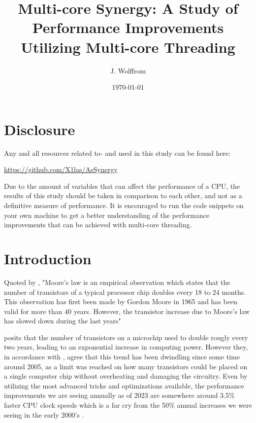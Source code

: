 \documentclass[12pt,a4paper]{article}
\title{Multi-core Synergy: A Study of Performance Improvements Utilizing Multi-core Threading}
\author{J. Wolffrom}
\date{\today}
\begin{document}
\maketitle
\newpage

\begin{abstract}

\end{abstract}
\newpage

\tableofcontents
\newpage

\section{Disclosure}

Any and all resources related to- and used in this study can be found here:

\href{https://github.com/X1las/AsSynergy}{https://github.com/X1las/AsSynergy}

Due to the amount of variables that can affect the performance of a CPU, the results of this study should be taken in comparison to each other, and not as a definitive measure of performance. It is encouraged to run the code snippets on your own machine to get a better understanding of the performance improvements that can be achieved with multi-core threading.

\section{Introduction}

Quoted by \cite{Rauber2023}, "Moore’s law is an empirical
observation which states that the number of transistors of a typical processor chip
doubles every 18 to 24 months. This observation has first been made by Gordon
Moore in 1965 and has been valid for more than 40 years. However, the transistor
increase due to Moore’s law has slowed down during the last years" 

\citeauthor{Rauber2023} posits that the number of transistors on a microchip used to double rougly every two years, leading to an exponential increase in computing power. However they, in accordance with \cite{Mattson2014}, agree that this trend has been dwindling since some time around 2005, as a limit was reached on how many transistors could be placed on a single computer chip without overheating and damaging the circuitry. Even by utilizing the most advanced tricks and optimizations available, the performance improvements we are seeing annually as of 2023 are somewhere around 3.5\% faster CPU clock speeds \parencite[p. 11]{Rauber2023} which is a far cry from the 50\% annual increases we were seeing in the early 2000's \parencite[p. 11]{Rauber2023}. 
\end{document}
